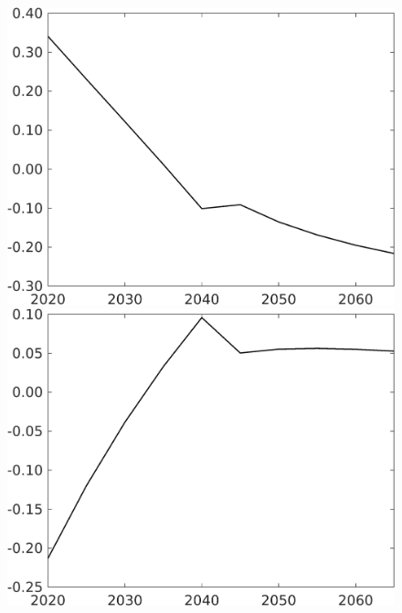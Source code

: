 \begin{figure}[h!!!]
\begin{minipage}[]{0.32\textwidth}
\end{minipage}
	\begin{minipage}[]{0.32\textwidth}
	\includegraphics[width=1\textwidth]{../../codding_model/own_basedOnFried/optimalPol_010922_revision/figures/all_13Sept22_Tplus30/gAf_OPT_COMPtaulPer_regime4_spillover0_knspil0_noskill0_sep0_xgrowth0_PV1_etaa0.79.png}
\end{minipage}
	\begin{minipage}[]{0.32\textwidth}
		\includegraphics[width=1\textwidth]{../../codding_model/own_basedOnFried/optimalPol_010922_revision/figures/all_13Sept22_Tplus30/gAg_OPT_COMPtaulPer_regime4_spillover0_knspil0_noskill0_sep0_xgrowth0_PV1_etaa0.79.png}

\end{minipage}
\end{figure}

